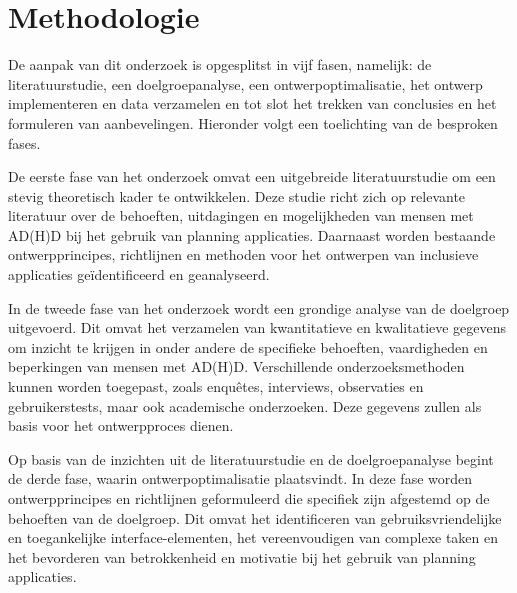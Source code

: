 
\section{Methodologie}%
\label{sec:methodologie}

De aanpak van dit onderzoek is opgesplitst in vijf fasen, namelijk: de literatuurstudie, een doelgroepanalyse, een ontwerpoptimalisatie, het ontwerp implementeren en data verzamelen en tot slot het trekken van conclusies en het formuleren van aanbevelingen. Hieronder volgt een toelichting van de besproken fases. \newline 


De eerste fase van het onderzoek omvat een uitgebreide literatuurstudie om een stevig theoretisch kader te ontwikkelen. Deze studie richt zich op relevante literatuur over de behoeften, uitdagingen en mogelijkheden van mensen met AD(H)D bij het gebruik van planning applicaties. Daarnaast worden bestaande ontwerpprincipes, richtlijnen en methoden voor het ontwerpen van inclusieve applicaties geïdentificeerd en geanalyseerd. \newline 

In de tweede fase van het onderzoek wordt een grondige analyse van de doelgroep uitgevoerd. Dit omvat het verzamelen van kwantitatieve en kwalitatieve gegevens om inzicht te krijgen in onder andere de specifieke behoeften, vaardigheden en beperkingen van mensen met AD(H)D. Verschillende onderzoeksmethoden kunnen worden toegepast, zoals enquêtes, interviews, observaties en gebruikerstests, maar ook academische onderzoeken. Deze gegevens zullen als basis voor het ontwerpproces dienen. \newline 

Op basis van de inzichten uit de literatuurstudie en de doelgroepanalyse begint de derde fase, waarin ontwerpoptimalisatie plaatsvindt. In deze fase worden ontwerpprincipes en richtlijnen geformuleerd die specifiek zijn afgestemd op de behoeften van de doelgroep. Dit omvat het identificeren van gebruiksvriendelijke en toegankelijke interface-elementen, het vereenvoudigen van complexe taken en het bevorderen van betrokkenheid en motivatie bij het gebruik van planning applicaties. \newline 

